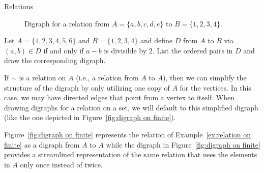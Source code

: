 \begin{section}{Relations}
\begin{figure}[h!]
\begin{center}
\caption{Digraph for a relation from $A=\{a,b,c,d,e\}$ to $B=\{1,2,3,4\}$.}\label{fig:digraph finite to finite}
\end{center}
\end{figure}

\begin{problem}
Let $A=\{1,2,3,4,5,6\}$ and $B=\{1,2,3,4\}$ and define $D$ from $A$ to $B$ via $(a,b)\in D$ if and only if $a-b$ is divisible by 2.  List the ordered pairs in $D$ and draw the corresponding digraph.
\end{problem}

If $\sim$ is a relation on $A$ (i.e., a relation from $A$ to $A$), then we can simplify the structure of the digraph by only utilizing one copy of $A$ for the vertices. In this case, we may have directed edges that point from a vertex to itself.  When drawing digraphs for a relation on a set, we will default to this simplified digraph (like the one depicted in Figure~\ref{fig:digraph on finite}).

\begin{example}\label{ex:digraph}
Figure~\ref{fig:digraph on finite} represents the relation of Example~\ref{ex:relation on finite} as a digraph from $A$ to $A$ while the digraph in Figure~\ref{fig:digraph on finite} provides a streamlined representation of the same relation that uses the elements in $A$ only once instead of twice.
\end{example}


\end{section}
